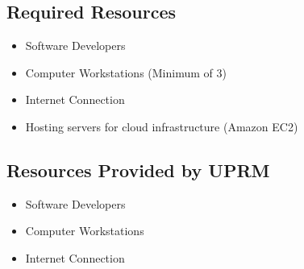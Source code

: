 
\subsection{Required Resources}
\begin{itemize}
\item Software Developers
\item Computer Workstations (Minimum of 3)
\item Internet Connection
\item Hosting servers for cloud infrastructure (Amazon EC2)
\end{itemize}

\subsection{Resources Provided by UPRM}
\begin{itemize}
\item Software Developers
\item Computer Workstations
\item Internet Connection
\end{itemize}
